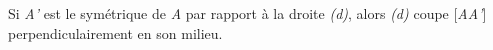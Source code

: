 Si {\sl A'} est le symétrique de {\sl A} par rapport à la droite
{\sl (d)}, alors {\sl (d)} coupe [{\sl AA'}] perpendiculairement en son milieu.